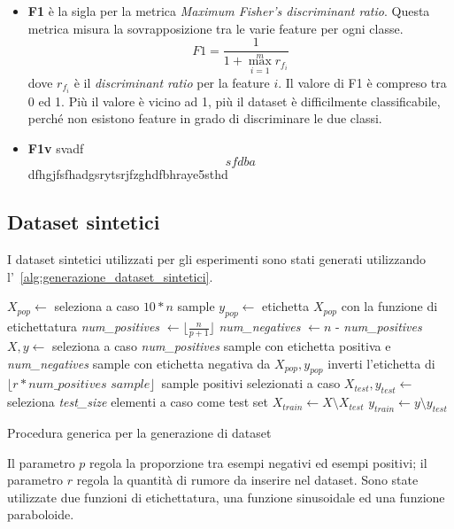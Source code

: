 \begin{itemize}
    \item \textbf{F1} è la sigla per la metrica \textit{Maximum Fisher’s discriminant ratio}. Questa metrica misura la sovrapposizione tra le varie feature per ogni classe.
    $$F1=\frac{1}{1+\max_{i=1}^{m}r_{f_{i}}}$$
    dove $r_{f_{i}}$ è il \textit{discriminant ratio} per la feature $i$.
    Il valore di F1 è compreso tra 0 ed 1. Più il valore è vicino ad 1, più il dataset è difficilmente classificabile, perché non esistono feature in grado di discriminare le due classi.
    \item \textbf{F1v} svadf
    $$sfdba$$
    dfhgjfsfhadgsrytsrjfzghdfbhraye5sthd
\end{itemize}

\subsection{Dataset sintetici}
I dataset sintetici utilizzati per gli esperimenti sono stati generati utilizzando l'~\cref{alg:generazione_dataset_sintetici}.

\begin{algorithm}[H]
    \SetAlgoLined
    $X_{pop} \leftarrow$ seleziona a caso $10*n$ sample\;
    $y_{pop} \leftarrow$ etichetta $X_{pop}$ con la funzione di etichettatura\;
    \textit{num\_positives}  $\leftarrow \lfloor\frac{n}{p + 1}\rfloor$ \;
    \textit{num\_negatives} $\leftarrow n$ - \textit{num\_positives}\;
    $X, y \leftarrow$ seleziona a caso \textit{num\_positives} sample con etichetta positiva e \textit{num\_negatives} sample con etichetta negativa da $X_{pop},y_{pop}$\;
    inverti l'etichetta di $\lfloor r * \textit{num\_positives sample} \rfloor$\ sample positivi selezionati a caso\;
    $X_{test}, y_{test} \leftarrow$ seleziona \textit{test\_size} elementi a caso come test set\;
    $X_{train} \leftarrow X \setminus X_{test}$\;
    $y_{train} \leftarrow y \setminus y_{test}$\;
\caption{Procedura generica per la generazione di dataset}
\label{alg:generazione_dataset_sintetici}
\end{algorithm}
Il parametro $p$ regola la proporzione tra esempi negativi ed esempi positivi; il parametro $r$ regola la quantità di rumore da inserire nel dataset.
Sono state utilizzate due funzioni di etichettatura, una funzione sinusoidale ed una funzione paraboloide.
